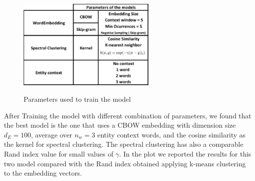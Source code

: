 \documentclass[]{article}
\begin{document}
\begin{figure}[h]
	\caption{Parameters used to train the model}
	\centering
	\includegraphics[width=0.6\textwidth]{Figures_Mik/Parameters.png}
	\label{fig:gull}
\end{figure}


After Training the model with different combination of parameters, we found that the best model is the one that uses a CBOW embedding with dimension size $d_E=100$, average over $n_w=3$ entity context words, and the cosine similarity as the kernel for spectral clustering. The spectral clustering has also a comparable Rand index value for small values of $\gamma$. In the plot we reported the results for this two model compared with the Rand index obtained applying k-means clustering to the embedding vectors. 
\end{document}
